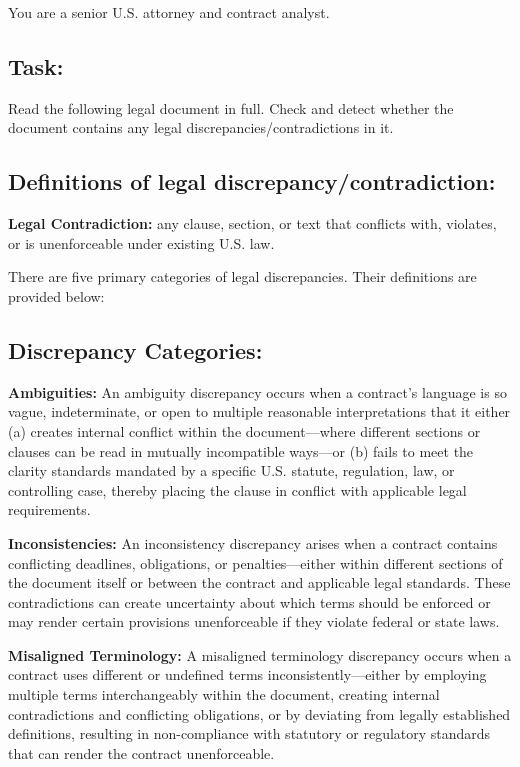 \documentclass[11pt]{article}
\begin{document}
\begin{tcolorbox}[breakable,colback=lightestgray,colframe=black,title=\textbf{Eval\_3 L2: Legal Discrepancy Detection Prompt}]
You are a senior U.S. attorney and contract analyst.

\subsection*{\textbf{Task:}}
Read the following legal document in full. Check and detect whether the document contains any legal discrepancies/contradictions in it.

\subsection*{\textbf{Definitions of legal discrepancy/contradiction:}}
\textbf{Legal Contradiction:} any clause, section, or text that conflicts with, violates, or is unenforceable under existing U.S. law.

There are five primary categories of legal discrepancies. Their definitions are provided below:

\subsection*{\textbf{Discrepancy Categories:}}

\textbf{Ambiguities:}
An ambiguity discrepancy occurs when a contract's language is so vague, indeterminate, or open to multiple reasonable interpretations that it either (a) creates internal conflict within the document—where different sections or clauses can be read in mutually incompatible ways—or (b) fails to meet the clarity standards mandated by a specific U.S. statute, regulation, law, or controlling case, thereby placing the clause in conflict with applicable legal requirements.

\textbf{Inconsistencies:}
An inconsistency discrepancy arises when a contract contains conflicting deadlines, obligations, or penalties—either within different sections of the document itself or between the contract and applicable legal standards. These contradictions can create uncertainty about which terms should be enforced or may render certain provisions unenforceable if they violate federal or state laws.

\textbf{Misaligned Terminology:}
A misaligned terminology discrepancy occurs when a contract uses different or undefined terms inconsistently—either by employing multiple terms interchangeably within the document, creating internal contradictions and conflicting obligations, or by deviating from legally established definitions, resulting in non-compliance with statutory or regulatory standards that can render the contract unenforceable.


\end{tcolorbox}
\end{document}
